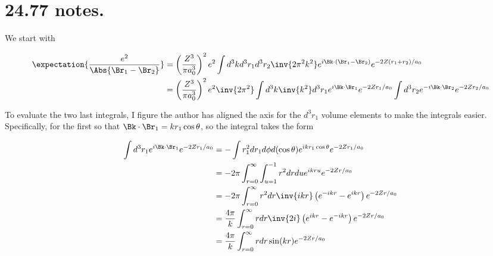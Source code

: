 
%

\chapter{24.77 notes.}

\beginArtWithToc

%

We start with

\begin{align*}
\expectation{\frac{e^2}{\Abs{\Br_1 - \Br_2}}}
&=
\left( \frac{Z^3}{\pi a_0^3}\right)^2 e^2
\int d^3 k d^3 r_1 d^3 r_2 \inv{2 \pi^2 k^2} e^{i \Bk \cdot (\Br_1 - \Br_2) } e^{ -2 Z (r_1 + r_2)/a_0} \\
&= 
\left( \frac{Z^3}{\pi a_0^3}\right)^2 e^2
\inv{2 \pi^2} 
\int d^3 k \inv{k^2}
d^3 r_1 
e^{i \Bk \cdot \Br_1 } e^{ -2 Z r_1 /a_0} 
\int 
d^3 r_2 
e^{-i \Bk \cdot \Br_2 } e^{ -2 Z r_2/a_0} \\
\end{align*}

To evaluate the two last integrals, I figure the author has aligned the axis for the $d^3 r_1$ volume elements to make the integrals easier.  Specifically, for the first so that $\Bk \cdot \Br_1 = k r_1 \cos\theta$, so the integral takes the form

\begin{align*}
\int 
d^3 r_1 
e^{i \Bk \cdot \Br_1 } e^{ -2 Z r_1 /a_0} 
&=
-\int 
r_1^2 d r_1 d\phi d(\cos\theta)
e^{i k r_1 \cos\theta } e^{ -2 Z r_1 /a_0} \\
&=
- 2 \pi \int_{r=0}^\infty \int_{u=1}^{-1}
r^2 dr du
e^{i k r u } e^{ -2 Z r /a_0} \\
&=
- 2 \pi \int_{r=0}^\infty 
r^2 dr 
\inv{i k r} \left( e^{-i k r } - e^{i k r} \right) e^{ -2 Z r /a_0} \\
&=
\frac{4 \pi}{k } \int_{r=0}^\infty 
r dr 
\inv{2i} \left( e^{i k r } - e^{-i k r} \right) e^{ -2 Z r /a_0} \\
&=
\frac{4 \pi}{k } \int_{r=0}^\infty r dr \sin(k r) e^{ -2 Z r /a_0} \\
\end{align*}

